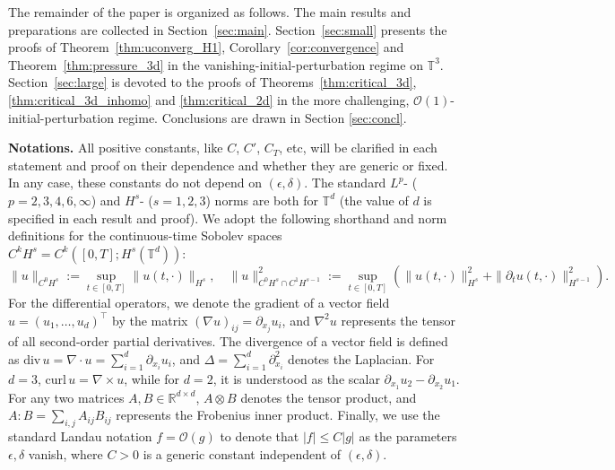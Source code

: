 \documentclass[reqno,10pt]{amsart}
\theoremstyle{definition}
\theoremstyle{remark}
\numberwithin{equation}{section}
\begin{document}
The remainder of the paper is organized as follows. The main results and preparations are collected in Section~\ref{sec:main}. Section~\ref{sec:small} presents the proofs of Theorem~\ref{thm:uconverg_H1}, Corollary~\ref{cor:convergence} and Theorem~\ref{thm:pressure_3d} in the vanishing-initial-perturbation regime on $\mathbb T^3$. Section~\ref{sec:large} is devoted to the proofs of Theorems~\ref{thm:critical_3d}, \ref{thm:critical_3d_inhomo} and \ref{thm:critical_2d} in the more challenging, $\mathcal O(1)$-initial-perturbation regime. Conclusions are drawn in Section \ref{sec:concl}.

\textbf{Notations.} All positive constants, like $C$, $C'$, $C_T$, etc, will be clarified in each statement and proof on their dependence and whether they are generic or fixed. In any case, these constants do not depend on $(\epsilon,\delta)$. The standard $L^p$- ($p=2,3,4,6,\infty$) and $H^s$- ($s=1,2,3$) norms are both for $\mathbb T^d$ (the value of $d$ is specified in each result and proof). We adopt the following shorthand and norm definitions for the continuous-time Sobolev spaces $C^k H^s = C^k([0,T]; H^s(\mathbb{T}^d))$:
\[
    \|u\|_{C^0 H^s} := \sup_{t \in [0, T]} \|u(t, \cdot)\|_{H^s}, \quad
    \|u\|_{C^0 H^s \cap C^1 H^{s-1}}^2 := \sup_{t \in [0, T]} \left( \|u(t, \cdot)\|_{H^s}^2 + \|\partial_t u(t, \cdot)\|_{H^{s-1}}^2 \right).
\]
For the differential operators, we denote the gradient of a vector field $u = (u_1, \dots, u_d)^\top$ by the matrix $(\nabla u)_{ij} = \partial_{x_j} u_i$, and $\nabla^2 u$ represents the tensor of all second-order partial derivatives. The divergence of a vector field is defined as $\text{div} \, u = \nabla \cdot u = \sum_{i=1}^d \partial_{x_i} u_i$, and $\Delta = \sum_{i=1}^d \partial_{x_i}^2$ denotes the Laplacian. For $d=3$, $\text{curl} \, u = \nabla \times u$, while for $d=2$, it is understood as the scalar $\partial_{x_1} u_2 - \partial_{x_2} u_1$. For any two matrices $A, B \in \mathbb{R}^{d \times d}$, $A \otimes B$ denotes the tensor product, and $A : B = \sum_{i,j} A_{ij} B_{ij}$ represents the Frobenius inner product. Finally, we use the standard Landau notation $f = \mathcal{O}(g)$ to denote that $|f| \leq C|g|$ as the parameters $\epsilon, \delta$ vanish, where $C>0$ is a generic constant independent of $(\epsilon,\delta)$.
\end{document}
